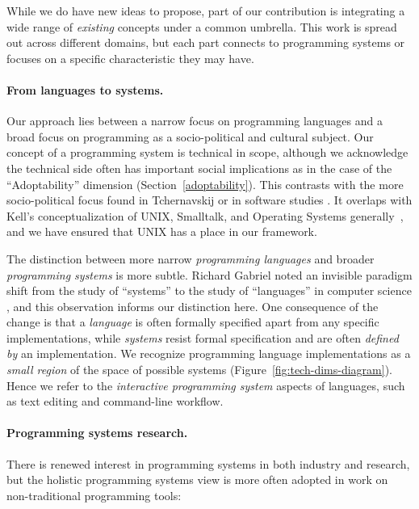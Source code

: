 While we do have new ideas to propose, part of our contribution is
integrating a wide range of \emph{existing} concepts under a common
umbrella. This work is spread out across different domains, but each
part connects to programming systems or focuses on a specific
characteristic they may have.

\paragraph{From languages to systems.}

Our approach lies between a narrow focus on programming languages and a
broad focus on programming as a socio-political and cultural subject.
Our concept of a programming system is technical in scope, although we
acknowledge the technical side often has important social implications
as in the case of the ``Adoptability'' dimension
(Section~\ref{adoptability}). This contrasts with the more
socio-political focus found in Tchernavskij \cite{TcherDiss} or in
software studies \cite{SwStudies}. It overlaps with Kell's
conceptualization of UNIX, Smalltalk, and Operating Systems
generally~\cite{KellOS}, and we have ensured that UNIX has a place in
our framework.

The distinction between more narrow \emph{programming languages} and
broader \emph{programming systems} is more subtle. Richard Gabriel noted
an invisible paradigm shift from the study of ``systems'' to the study
of ``languages'' in computer science \cite{PLrev}, and this observation
informs our distinction here. One consequence of the change is that a
\emph{language} is often formally specified apart from any specific
implementations, while \emph{systems} resist formal specification and
are often \emph{defined by} an implementation. We recognize programming
language implementations as a \emph{small region} of the space of
possible systems (Figure~\ref{fig:tech-dims-diagram}). Hence we refer to
the \emph{interactive programming system} aspects of languages, such as
text editing and command-line workflow.

\paragraph{Programming systems research.}

There is renewed interest in programming systems in both industry and
research, but the holistic programming systems view is more often
adopted in work on non-traditional programming tools:

